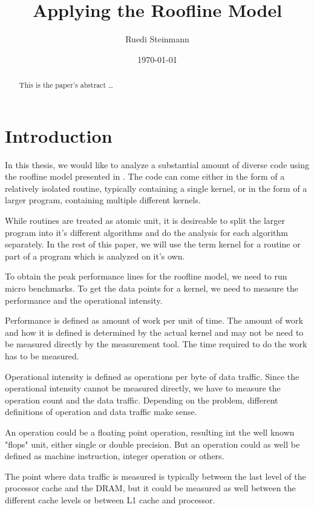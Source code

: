 \documentclass[a4paper,12pt]{article}
\title{Applying the Roofline Model}
\author{Ruedi Steinmann}
\date{\today}
\begin{document}
\maketitle

\begin{abstract}
This is the paper's abstract \ldots
\end{abstract}

\tableofcontents

\section{Introduction}
In this thesis, we would like to analyze a substantial amount of diverse code using the roofline model presented in \cite{Roofline}. The code can come either in the form of a relatively isolated routine, typically containing a single kernel, or in the form of a larger program, containing multiple different kernels.

While routines are treated as atomic unit, it is desireable to split the larger program into it's different algorithms and do the analysis for each algorithm separately. In the rest of this paper, we will use the term kernel for a routine or part of a program which is analyzed on it's own.

To obtain the peak performance lines for the roofline model, we need to run micro benchmarks. To get the data points for a kernel, we need to measure the performance and the operational intensity. 

Performance is defined as amount of work per unit of time. The amount of work and how it is defined is determined by the actual kernel and may not be need to be measured directly by the measurement tool. The time required to do the work has to be measured.

Operational intensity is defined as operations per byte of data traffic. Since the operational intensity cannot be measured directly, we have to measure the operation count and the data traffic. Depending on the problem, different definitions of operation and data traffic make sense.

An operation could be a floating point operation, resulting int the well known "flops" unit, either single or double precision. But an operation could as well be defined as machine instruction, integer operation or others.

The point where data traffic is measured is typically between the last level of the processor cache and the DRAM, but it could be measured as well between the different cache levels or between L1 cache and processor.
\end{document}
